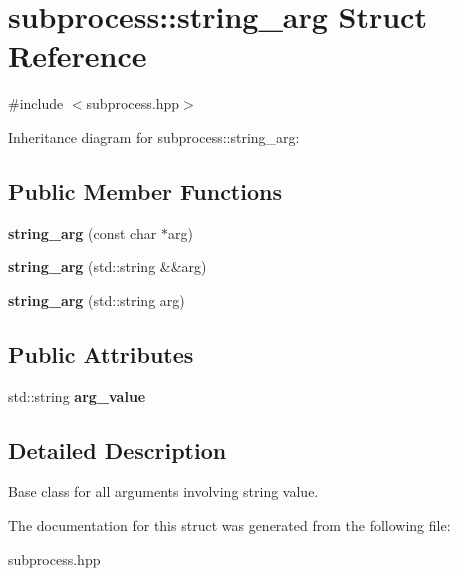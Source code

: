 \hypertarget{structsubprocess_1_1string__arg}{}\section{subprocess\+:\+:string\+\_\+arg Struct Reference}
\label{structsubprocess_1_1string__arg}


{\ttfamily \#include $<$subprocess.\+hpp$>$}



Inheritance diagram for subprocess\+:\+:string\+\_\+arg\+:
\subsection*{Public Member Functions}
\begin{DoxyCompactItemize}
\item 
\mbox{\label{structsubprocess_1_1string__arg_a44b8d3fc7dd216c733c1a2456afa77af}} 
{\bfseries string\+\_\+arg} (const char $\ast$arg)
\item 
\mbox{\label{structsubprocess_1_1string__arg_aab3342d4e80e3b64eee25018b9bc2e21}} 
{\bfseries string\+\_\+arg} (std\+::string \&\&arg)
\item 
\mbox{\label{structsubprocess_1_1string__arg_a5df68017e7d8a80417d0ff06416de7a3}} 
{\bfseries string\+\_\+arg} (std\+::string arg)
\end{DoxyCompactItemize}
\subsection*{Public Attributes}
\begin{DoxyCompactItemize}
\item 
\mbox{\label{structsubprocess_1_1string__arg_a41ff4b90caaa4f0f7215427f09da911b}} 
std\+::string {\bfseries arg\+\_\+value}
\end{DoxyCompactItemize}


\subsection{Detailed Description}
Base class for all arguments involving string value. 

The documentation for this struct was generated from the following file\+:\begin{DoxyCompactItemize}
\item 
subprocess.\+hpp\end{DoxyCompactItemize}
